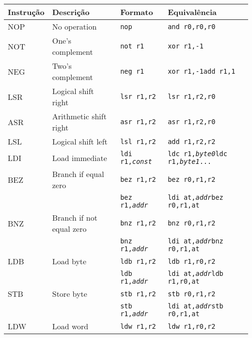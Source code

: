 \documentclass{extreport}
\begin{document}
\begin{table}[ht!]
\centering
\begin{tabular}{|p{2.0cm}|p{4.0cm}|p{3.5cm}|p{3.5cm}|}
\hline
\bf{Instrução} 				& \bf{Descrição} & \bf{Formato} & \bf{Equivalência} \\ \hline \hline
NOP  & No operation 			& \texttt{nop} & \texttt{and r0,r0,r0}  \\ \hline
NOT  & One's complement 		& \texttt{not r1} & \texttt{xor r1,-1}  \\ \hline
NEG  & Two's complement			& \texttt{neg r1} & \texttt{xor r1,-1\newline add r1,1} \\ \hline
LSR  & Logical shift right		& \texttt{lsr r1,r2} & \texttt{lsr r1,r2,r0} \\ \hline
ASR  & Arithmetic shift right		& \texttt{asr r1,r2} & \texttt{asr r1,r2,r0} \\ \hline
LSL  & Logical shift left		& \texttt{lsl r1,r2} & \texttt{add r1,r2,r2} \\ \hline
LDI  & Load immediate			& \texttt{ldi r1,\textit{const}} & \texttt{ldc r1,\textit{byte0}\newline ldc r1,\textit{byte1}\newline ...} \\ \hline
BEZ  & Branch if equal zero		& \texttt{bez r1,r2} & \texttt{bez r0,r1,r2} \\ \hline
	& 				& \texttt{bez r1,\textit{addr}} & \texttt{ldi at,\textit{addr}\newline bez r0,r1,at} \\ \hline
BNZ  & Branch if not equal zero		& \texttt{bnz r1,r2} & \texttt{bnz r0,r1,r2} \\ \hline
	& 				& \texttt{bnz r1,\textit{addr}} & \texttt{ldi at,\textit{addr}\newline bnz r0,r1,at} \\ \hline
LDB  & Load byte			& \texttt{ldb r1,r2} & \texttt{ldb r1,r0,r2} \\ \hline
	& 				& \texttt{ldb r1,\textit{addr}} & \texttt{ldi at,\textit{addr}\newline ldb r1,r0,at} \\ \hline
STB  & Store byte			& \texttt{stb r1,r2} & \texttt{stb r0,r1,r2} \\ \hline
	& 				& \texttt{stb r1,\textit{addr}} & \texttt{ldi at,\textit{addr}\newline stb r0,r1,at} \\ \hline
LDW  & Load word			& \texttt{ldw r1,r2} & \texttt{ldw r1,r0,r2} \\ \hline

\end{tabular}
\end{table}
\end{document}

